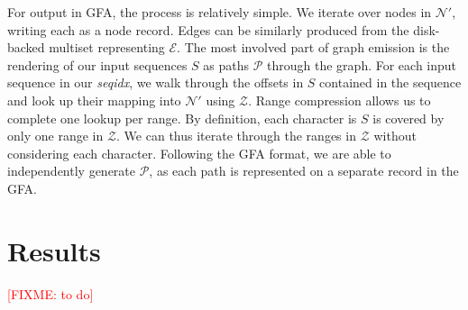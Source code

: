 \documentclass{bioinfo}
\theoremstyle{definition}
\newcommand{\red}[1]{{\textcolor{Red}{#1}}}
\newcommand{\FIXME}[1]{\red{[FIXME: #1]}}
\begin{document}
For output in GFA, the process is relatively simple.
We iterate over nodes in $\mathcal{N}'$, writing each as a node record.
Edges can be similarly produced from the disk-backed multiset representing $\mathcal{E}$.
The most involved part of graph emission is the rendering of our input sequences $S$ as paths $\mathcal{P}$ through the graph.
For each input sequence in our \textit{seqidx}, we walk through the offsets in $S$ contained in the sequence and look up their mapping into $\mathcal{N}'$ using $\mathcal{Z}$.
Range compression allows us to complete one lookup per range.
By definition, each character is $S$ is covered by only one range in $\mathcal{Z}$.
We can thus iterate through the ranges in $\mathcal{Z}$ without considering each character.
Following the GFA format, we are able to independently generate $\mathcal{P}$, as each path is represented on a separate record in the GFA.



\section{Results}
\label{sec:results}
\FIXME{to do}

\end{document}
